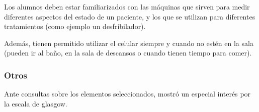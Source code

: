 Los alumnos deben estar familiarizados con las máquinas que sirven para
medir diferentes aspectos del estado de un paciente, y los que se
utilizan para diferentes tratamientos (como ejemplo un desfribilador).

Además, tienen permitido utilizar el celular siempre y cuando no estén
en la sala (pueden ir al baño, en la sala de descansos o cuando tienen
tiempo para comer).

\subsubsection{Otros}

Ante consultas sobre los elementos seleccionados, mostró un especial
interés por la escala de glasgow.
